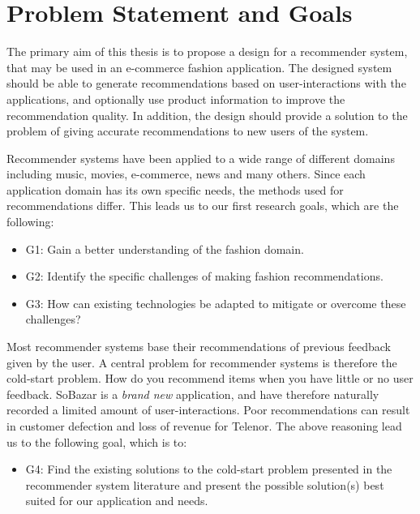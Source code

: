 
\section{Problem Statement and Goals}

The primary aim of this thesis is to propose a design for a recommender system, that may be used in an
e-commerce fashion application. The designed system should be able to generate recommendations based on
user-interactions with the applications, and optionally use product information to improve the recommendation
quality. In addition, the design should provide a solution to the problem of giving accurate recommendations
to new users of the system.

Recommender systems have been applied to a wide range of different domains including music, movies, e-commerce, news
and many others. Since each application domain has its own specific needs, the methods used for recommendations differ.
This leads us to our first research goals, which are the following:

\begin{itemize}
	\item G1: Gain a better understanding of the fashion domain.
  	\item G2: Identify the specific challenges of making fashion recommendations.
  	\item G3: How can existing technologies be adapted to mitigate or overcome these challenges?
\end{itemize}

Most recommender systems base their recommendations of previous feedback given by the user. A central problem for
recommender systems is therefore the cold-start problem. How do you recommend items when you have little or no
user feedback. SoBazar is a \emph{brand new} application, and have therefore naturally recorded a limited amount
of user-interactions. Poor recommendations can result in customer defection and loss of revenue for Telenor.
The above reasoning lead us to the following goal, which is to:

\begin{itemize}
  \item G4: Find the existing solutions to the cold-start problem presented in the recommender system literature
  		and present the possible solution(s) best suited for our application and needs.
\end{itemize}

